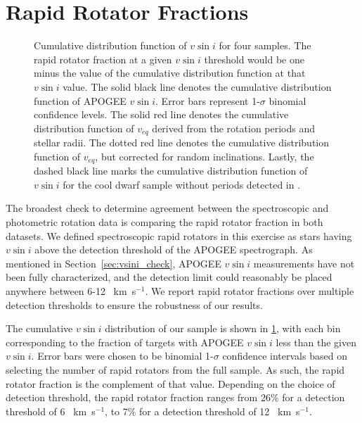 \documentclass[manuscript]{aastex6}
\newcommand{\vsini}{\ensuremath{v \sin i}}
\newcommand{\kms}{\textrm{~km~s}\ensuremath{^{-1}}}
\begin{document}
\section{Rapid Rotator Fractions}
\label{sec:fraction}

\begin{figure}[htb]
    \caption{Cumulative distribution function of \vsini{} for four
    samples. The rapid rotator fraction at a given \vsini{} threshold
    would be one minus the value of the cumulative distribution function
    at that \vsini{} value. The solid black line denotes the cumulative
    distribution function of APOGEE \vsini{}. Error bars represent 
    1-\(\sigma\) binomial confidence levels. The solid red line denotes
    the cumulative distribution function of \(v_{eq}\) derived from the
    rotation periods and stellar radii. The dotted red line denotes the
    cumulative distribution function of \(v_{eq}\), but corrected for
    random inclinations. Lastly, the dashed black line marks the
    cumulative distribution function of \vsini{} for the cool dwarf
    sample without periods detected in 
    \citet{McQuillan14}.\label{fig:detection_fraction}}
\end{figure}

The broadest check to determine agreement between the spectroscopic
and photometric rotation data is comparing the rapid rotator fraction
in both datasets. We defined spectroscopic rapid rotators in this exercise as 
stars having \vsini{} above the detection threshold of the APOGEE 
spectrograph. As mentioned in 
Section~\ref{sec:vsini_check}, APOGEE \vsini{} measurements have not been fully
characterized, and the detection limit could reasonably be placed anywhere 
between 6-12 \kms{}. We report rapid rotator fractions over multiple detection 
thresholds to ensure the robustness of our results.

The cumulative \vsini{} distribution of our sample is shown in
\cref{fig:detection_fraction}, with each bin corresponding to the
fraction of targets with APOGEE \vsini{} less than the given
\vsini{}. Error bars were chosen to be binomial 1-\(\sigma\) confidence 
intervals based on selecting the number of rapid rotators from the full 
sample.  As such, the rapid rotator fraction is the complement of that
value. Depending on the choice of detection threshold, the rapid rotator 
fraction ranges from 26\% for a detection threshold of 6 \kms, to 7\%
for a detection threshold of 12 \kms.
\end{document}
